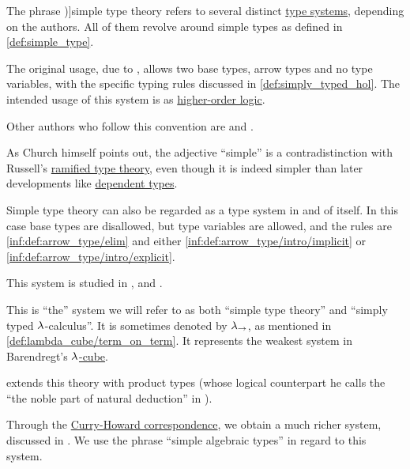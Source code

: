 \begin{concept}\label{con:simple_type_theory}
  The phrase \term[en=simple type theory (\cite[ix]{Hindley1997BasicSTT})]{simple type theory} refers to several distinct \hyperref[def:abstract_type_system]{type systems}, depending on the authors. All of them revolve around simple types as defined in \cref{def:simple_type}.

  \begin{thmenum}
     The original usage, due to , allows two base types, arrow types and no type variables, with the specific typing rules discussed in \cref{def:simply_typed_hol}. The intended usage of this system is as \hyperref[rem:predicate_logic]{higher-order logic}.

    Other authors who follow this convention are  and .

    As Church himself points out, the adjective \enquote{simple} is a contradistinction with Russell's \hyperref[con:ramified_type_theory]{ramified type theory}, even though it is indeed simpler than later developments like \hyperref[con:dependent_type]{dependent types}.

     Simple type theory can also be regarded as a type system in and of itself. In this case base types are disallowed, but type variables are allowed, and the rules are \ref{inf:def:arrow_type/elim} and either \ref{inf:def:arrow_type/intro/implicit} or \ref{inf:def:arrow_type/intro/explicit}.

    This system is studied in ,  and .

    This is \enquote{the} system we will refer to as both \enquote{simple type theory} and \enquote{simply typed \( {\mathrm \lambda} \)-calculus}. It is sometimes denoted by \( {\mathrm \lambda}_{\rightarrow} \), as mentioned in \cref{def:lambda_cube/term_on_term}. It represents the weakest system in Barendregt's \hyperref[def:lambda_cube]{\( {\mathrm \lambda} \)-cube}.

     extends this theory with product types (whose logical counterpart he calls the \enquote{the noble part of natural deduction} in \cite[\S 5.3]{GirardEtAl1989ProofsAndTypes}).

     Through the \hyperref[con:curry_howard_correspondence]{Curry-Howard correspondence}, we obtain a much richer system, discussed in . We use the phrase \enquote{simple algebraic types} in regard to this system.


\end{thmenum}
\end{concept}
